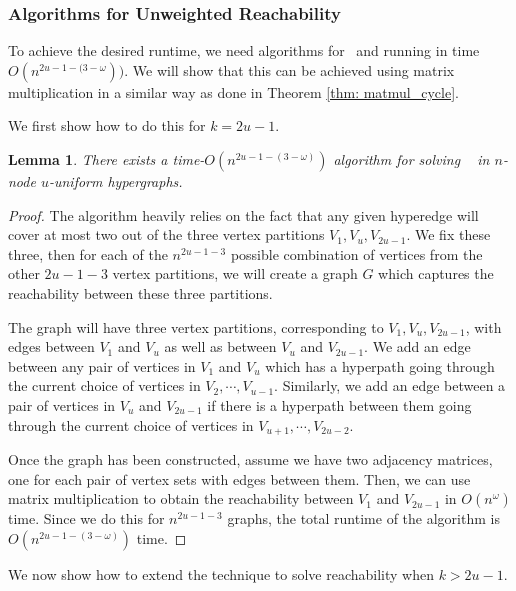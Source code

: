 \documentclass[11pt,letterpaper,pdftex]{article}
\newtheorem{lemma}[theorem]{Lemma}
\begin{document}
\subsubsection{Algorithms for Unweighted Reachability}

To achieve the desired runtime, we need algorithms for \uCLR~and  running in time $O(n^{2u-1- (3-\omega}))$. 
We will show that this can be achieved using matrix multiplication in a similar way as done in Theorem \ref{thm: matmul_cycle}.

We first show how to do this for $k=2u-1$.
\begin{lemma} \label{lem: uECLR algorithm}
    There exists a time-$O(n^{2u-1-(3-\omega)})$ algorithm for solving \uCLR~ in $n$-node $u$-uniform hypergraphs.
\end{lemma}
\begin{proof}
    The algorithm heavily relies on the fact that any given hyperedge will cover at most two out of the three vertex partitions $V_1,V_u,V_{2u-1}$.
    We fix these three, then for each of the $n^{2u-1-3}$ possible combination of vertices from the other $2u-1-3$ vertex partitions, we will create a graph $G$ which captures the reachability between these three partitions.

    The graph will have three vertex partitions, corresponding to $V_1, V_u, V_{2u-1}$, with edges between $V_1$ and $V_u$ as well as between $V_u$ and $V_{2u-1}$.
    We add an edge between any pair of vertices in $V_1$ and $V_u$ which has a hyperpath going through the current choice of vertices in $V_2, \cdots, V_{u-1}$.
    Similarly, we add an edge between a pair of vertices in $V_u$ and $V_{2u-1}$ if there is a hyperpath between them going through the current choice of vertices in $V_{u+1}, \cdots, V_{2u-2}$.

    Once the graph has been constructed, assume we have two adjacency matrices, one for each pair of vertex sets with edges between them.
    Then, we can use matrix multiplication to obtain the reachability between $V_1$ and $V_{2u-1}$ in $O(n^{\omega})$ time.
    Since we do this for $n^{2u-1-3}$ graphs, the total runtime of the algorithm is $O(n^{2u-1-(3-\omega)})$ time.
\end{proof}

We now show how to extend the technique to solve reachability when $k>2u-1$.
\end{document}
